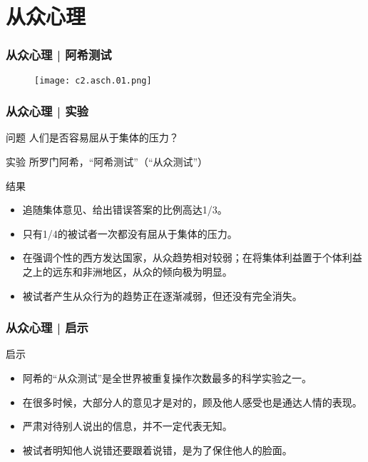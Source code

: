 \section{从众心理}
\begin{frame}
  \frametitle{从众心理 | 阿希测试}
  \begin{figure}
    \centering
    \texttt{[image: c2.asch.01.png]}
  \end{figure}
\end{frame}

\begin{frame}
  \frametitle{从众心理 | 实验}
  \begin{block}{问题}
    人们是否容易屈从于集体的压力？
  \end{block}
  \pause
  \begin{block}{实验}
    所罗门\textbullet 阿希，“阿希测试”（“从众测试”）
  \end{block}
  \pause
  \begin{block}{结果}
    \begin{itemize}
      \item 追随集体意见、给出错误答案的比例高达1/3。
      \item 只有1/4的被试者一次都没有屈从于集体的压力。
      \item 在强调个性的西方发达国家，从众趋势相对较弱；在将集体利益置于个体利益之上的远东和非洲地区，从众的倾向极为明显。
      \item 被试者产生从众行为的趋势正在逐渐减弱，但还没有完全消失。
    \end{itemize}
  \end{block}
\end{frame}

\begin{frame}
  \frametitle{从众心理 | 启示}
  \begin{block}{启示}
    \begin{itemize}
      \item 阿希的“从众测试”是全世界被重复操作次数最多的科学实验之一。
      \item 在很多时候，大部分人的意见才是对的，顾及他人感受也是通达人情的表现。
      \item 严肃对待别人说出的信息，并不一定代表无知。
      \item 被试者明知他人说错还要跟着说错，是为了保住他人的脸面。
    \end{itemize}
  \end{block}
\end{frame}

